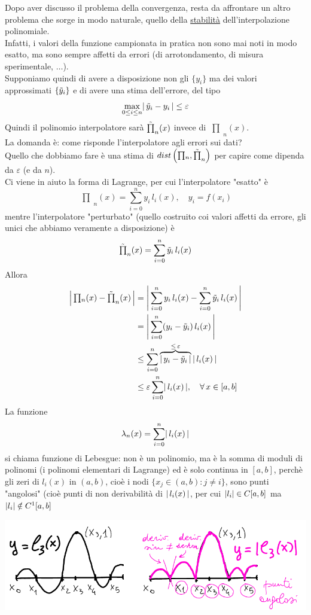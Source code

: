 \documentclass[12pt]{article}
\DeclarePairedDelimiter{\abs}{\lvert}{\rvert}
\newcommand{\inter}{\begin{matrix}\prod\end{matrix}}
\begin{document}
Dopo aver discusso il problema della convergenza, resta da affrontare un altro problema che sorge in modo naturale, quello della \underline{stabilità} dell'interpolazione polinomiale.\\
Infatti, i valori della funzione campionata in pratica non sono mai noti in modo esatto, ma sono sempre affetti da errori (di arrotondamento, di misura sperimentale, $\dotso$).\\
Supponiamo quindi di avere a disposizione non gli $\{y_i\}$ ma dei valori approssimati $\{\Tilde{y}_i\}$ e di avere una stima dell'errore, del tipo
\[\max_{0 \le i \le n} \abs*{\,\Tilde{y}_i - y_i\,} \le \varepsilon\]
Quindi il polinomio interpolatore sarà $\Tilde{\inter}_n(x)$ invece di $\inter_n(x)$.\\
La domanda è: come risponde l'interpolatore agli errori sui dati?\\
Quello che dobbiamo fare è una stima di $dist \left(\inter_n, \Tilde{\inter}_n \right)$ per capire come dipenda da $\varepsilon$ (e da $n$).\\
Ci viene in aiuto la forma di Lagrange, per cui l'interpolatore "esatto" è
\[\inter_n(x) = \sum_{i=0}^n y_i \, l_i(x), \quad y_i = f(x_i)\]
mentre l'interpolatore "perturbato" (quello costruito coi valori affetti da errore, gli unici che abbiamo veramente a disposizione) è
\[\Tilde{\inter}_n(x) = \sum_{i=0}^n \Tilde{y}_i \, l_i(x)\]
Allora
\[\begin{split}
    \abs*{\,\inter_n(x) - \Tilde{\inter}_n(x)\,} & = \abs*{\,\sum_{i=0}^n y_i \, l_i(x) - \sum_{i=0}^n \Tilde{y}_i \, l_i(x)\,} \\
    & = \abs*{\,\sum_{i=0}^n (y_i - \Tilde{y}_i)\, l_i(x) \,} \\
    & \le \sum_{i=0}^n \overbrace{\abs*{\,y_i - \tilde{y}_i\,}}^{\le\, \varepsilon}\, \abs{\,l_i(x)\,} \\
    & \le \varepsilon \sum_{i=0}^n \abs{\,l_i(x)\,}, \quad \forall\, x \in [a,b]
\end{split}\]
La funzione 
\[\lambda_n(x) = \sum_{i=0}^n \abs*{\,l_i(x)\,}\]
si chiama funzione di Lebesgue: non è un polinomio, ma è la somma di moduli di polinomi (i polinomi elementari di Lagrange) ed è solo continua in $[a,b]$, perchè gli zeri di $l_i(x)$ in $(a,b)$, cioè i nodi $\{x_j \in (a,b) : j \ne i\}$, sono punti "angolosi" (cioè punti di non derivabilità di $\abs{\,l_i(x)\,}$, per cui $\abs{l_i}\in C[a,b]$ ma $\abs{l_i} \notin C^1[a,b]$
\begin{center}
    \includegraphics[scale=0.8]{lez13_img2.png}
\end{center}
\end{document}
